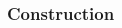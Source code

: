 	
	\begin{frame}\frametitle{Construction}
		\begin{columns}
			\begin{column}{0.9\textwidth}
				\begin{center}
				\end{center}		
			\end{column}
		\end{columns}
	\end{frame}	

